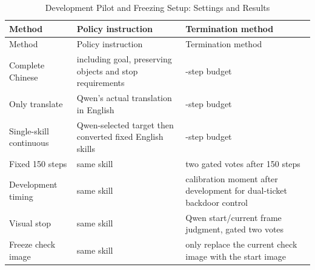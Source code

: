 \FloatBarrier\begingroup\small\setlength{\tabcolsep}{2.5pt}
\begin{longtable}[]{@{}
  >{\raggedright\arraybackslash}p{}
  >{\raggedright\arraybackslash}p{}
  >{\raggedright\arraybackslash}p{}@{}}
\caption{Development Pilot and Freezing Setup: Settings and Results}\label{tab:s13-2}\tabularnewline
\toprule\noalign{}
\begin{minipage}[b]{\linewidth}\raggedright
Method
\end{minipage} & \begin{minipage}[b]{\linewidth}\raggedright
Policy instruction
\end{minipage} & \begin{minipage}[b]{\linewidth}\raggedright
Termination method
\end{minipage} \\
\midrule\noalign{}
\endfirsthead
\toprule\noalign{}
\begin{minipage}[b]{\linewidth}\raggedright
Method
\end{minipage} & \begin{minipage}[b]{\linewidth}\raggedright
Policy instruction
\end{minipage} & \begin{minipage}[b]{\linewidth}\raggedright
Termination method
\end{minipage} \\
\midrule\noalign{}
\endhead
\bottomrule\noalign{}
\endlastfoot
Complete Chinese & including goal, preserving objects and stop requirements & 300-step budget \\
Only translate & Qwen's actual translation in English & 300-step budget \\
Single-skill continuous & Qwen-selected target then converted fixed English skills & 300-step budget \\
Fixed 150 steps & same skill & two gated votes after 150 steps \\
Development timing & same skill & calibration moment after development for dual-ticket backdoor control \\
Visual stop & same skill & Qwen start/current frame judgment, gated two votes \\
Freeze check image & same skill & only replace the current check image with the start image \\
\end{longtable}\endgroup

